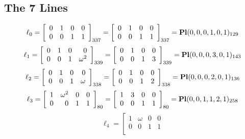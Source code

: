 \documentclass{article}
\begin{document}
{\subsection*{The 7 Lines}
$$
\ell_{0} = 
\left[
\begin{array}{*{4}{r}}
0 & 1 & 0 & 0\\
0 & 0 & 1 & 1\\
\end{array}
\right]
_{337}
=
\left[
\begin{array}{*{4}c}
0  & 1  & 0  & 0\\
0  & 0  & 1  & 1\\
\end{array}
\right]_{337}
={\rm\bf Pl}(0,0,0,1,0,1 )_{129}$$
$$
\ell_{1} = 
\left[
\begin{array}{*{4}{r}}
0 & 1 & 0 & 0\\
0 & 0 & 1 & \omega^{2}\\
\end{array}
\right]
_{339}
=
\left[
\begin{array}{*{4}c}
0  & 1  & 0  & 0\\
0  & 0  & 1  & 3\\
\end{array}
\right]_{339}
={\rm\bf Pl}(0,0,0,3,0,1 )_{143}$$
$$
\ell_{2} = 
\left[
\begin{array}{*{4}{r}}
0 & 1 & 0 & 0\\
0 & 0 & 1 & \omega \\
\end{array}
\right]
_{338}
=
\left[
\begin{array}{*{4}c}
0  & 1  & 0  & 0\\
0  & 0  & 1  & 2\\
\end{array}
\right]_{338}
={\rm\bf Pl}(0,0,0,2,0,1 )_{136}$$
$$
\ell_{3} = 
\left[
\begin{array}{*{4}{r}}
1 & \omega^{2} & 0 & 0\\
0 & 0 & 1 & 1\\
\end{array}
\right]
_{80}
=
\left[
\begin{array}{*{4}c}
1  & 3  & 0  & 0\\
0  & 0  & 1  & 1\\
\end{array}
\right]_{80}
={\rm\bf Pl}(0,0,1,1,2,1 )_{258}$$
$$
\ell_{4} = 
\left[
\begin{array}{*{4}{r}}
1 & \omega  & 0 & 0\\
0 & 0 & 1 & 1\\

\end{array}$$}
\end{document}
